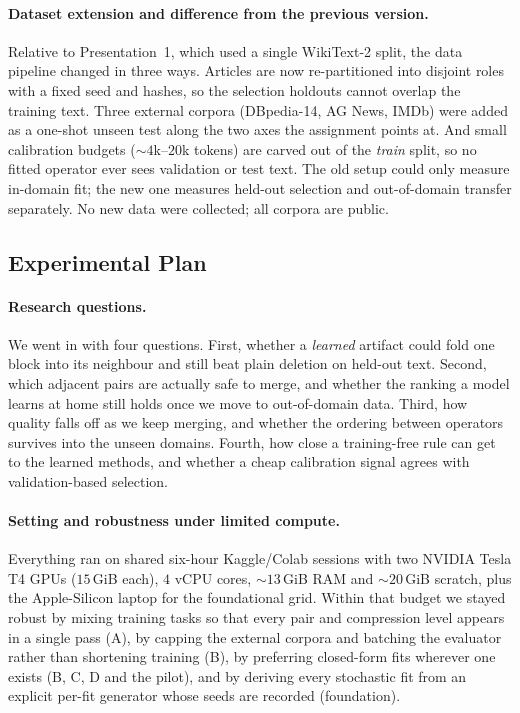 \documentclass[10pt,a4paper]{article}
\begin{document}
\paragraph{Dataset extension and difference from the previous version.}
Relative to Presentation~1, which used a single WikiText-2 split, the data
pipeline changed in three ways. Articles are now re-partitioned into disjoint
roles with a fixed seed and hashes, so the selection holdouts cannot overlap
the training text. Three external corpora (DBpedia-14, AG News, IMDb) were
added as a one-shot unseen test along the two axes the assignment points at.
And small calibration budgets (${\sim}4$k--$20$k tokens) are carved out of the
\emph{train} split, so no fitted operator ever sees validation or test text.
The old setup could only measure in-domain fit; the new one measures held-out
selection and out-of-domain transfer separately. No new data were collected;
all corpora are public.

\subsection{Experimental Plan}
\label{sec:plan}

\paragraph{Research questions.}
We went in with four questions. First, whether a \emph{learned} artifact could
fold one block into its neighbour and still beat plain deletion on held-out
text. Second, which adjacent pairs are actually safe to merge, and whether the
ranking a model learns at home still holds once we move to out-of-domain data.
Third, how quality falls off as we keep merging, and whether the ordering
between operators survives into the unseen domains. Fourth, how close a
training-free rule can get to the learned methods, and whether a cheap
calibration signal agrees with validation-based selection.

\paragraph{Setting and robustness under limited compute.} Everything ran on shared
six-hour Kaggle/Colab sessions with two NVIDIA Tesla T4 GPUs ($15$\,GiB each),
$4$ vCPU cores, ${\sim}13$\,GiB RAM and ${\sim}20$\,GiB scratch, plus the
Apple-Silicon laptop for the foundational grid. Within that budget we stayed
robust by mixing training tasks so that every pair and compression level
appears in a single pass (A), by capping the external corpora and batching the
evaluator rather than shortening training (B), by preferring closed-form fits
wherever one exists (B, C, D and the pilot), and by deriving every stochastic
fit from an explicit per-fit generator whose seeds are recorded
(foundation).
\end{document}
